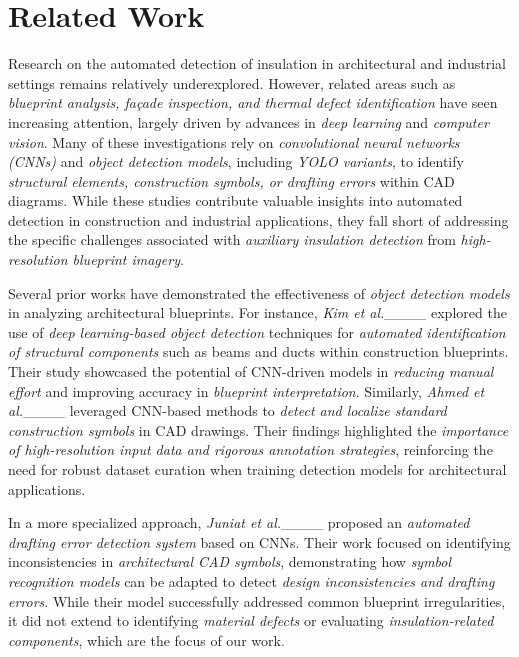\section{Related Work}
Research on the automated detection of insulation in architectural and industrial settings remains relatively underexplored. However, related areas such as \textit{blueprint analysis, façade inspection, and thermal defect identification} have seen increasing attention, largely driven by advances in \textit{deep learning} and \textit{computer vision}. Many of these investigations rely on \textit{convolutional neural networks (CNNs)} and \textit{object detection models}, including \textit{YOLO variants}, to identify \textit{structural elements, construction symbols, or drafting errors} within CAD diagrams. While these studies contribute valuable insights into automated detection in construction and industrial applications, they fall short of addressing the specific challenges associated with \textit{auxiliary insulation detection} from \textit{high-resolution blueprint imagery}.  

Several prior works have demonstrated the effectiveness of \textit{object detection models} in analyzing architectural blueprints. For instance, \textit{Kim et al.}____ explored the use of \textit{deep learning-based object detection} techniques for \textit{automated identification of structural components} such as beams and ducts within construction blueprints. Their study showcased the potential of CNN-driven models in \textit{reducing manual effort} and improving accuracy in \textit{blueprint interpretation}. Similarly, \textit{Ahmed et al.}____ leveraged CNN-based methods to \textit{detect and localize standard construction symbols} in CAD drawings. Their findings highlighted the \textit{importance of high-resolution input data and rigorous annotation strategies}, reinforcing the need for robust dataset curation when training detection models for architectural applications.  

In a more specialized approach, \textit{Juniat et al.}____ proposed an \textit{automated drafting error detection system} based on CNNs. Their work focused on identifying inconsistencies in \textit{architectural CAD symbols}, demonstrating how \textit{symbol recognition models} can be adapted to detect \textit{design inconsistencies and drafting errors}. While their model successfully addressed common blueprint irregularities, it did not extend to identifying \textit{material defects} or evaluating \textit{insulation-related components}, which are the focus of our work.  


